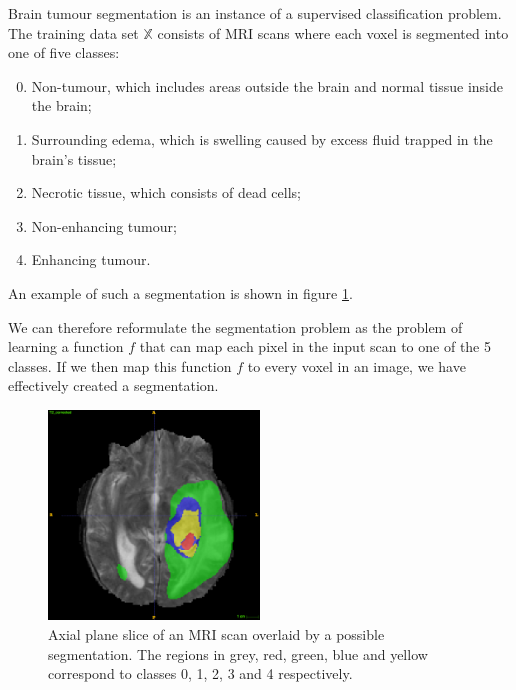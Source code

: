 \documentclass[12pt,a4paper,twoside,openright]{report}
\begin{document}
Brain tumour segmentation is an instance of a supervised classification problem. The training data set $\mathbb{X}$ consists of MRI scans where each voxel is segmented into one of five classes:
\begin{enumerate}
	\setcounter{enumi}{-1}
	\item Non-tumour, which includes areas outside the brain and normal tissue inside the brain;
	\item Surrounding edema, which is swelling caused by excess fluid trapped in the brain's tissue;
	\item Necrotic tissue, which consists of dead cells;
	\item Non-enhancing tumour;
	\item Enhancing tumour.
\end{enumerate} 
An example of such a segmentation is shown in figure \ref{fig:example_segmentation}.

We can therefore reformulate the segmentation problem as the problem of learning a function $f$ that can map each pixel in the input scan to one of the 5 classes. If we then map this function $f$ to every voxel in an image, we have effectively created a segmentation.

\begin{figure}
	\centering
	\includegraphics[width = 0.5\textwidth]{challenge_1_segmentation_with_T2_66}
	\caption[Axial plane slice of an MRI scan overlaid by a possible segmentation.]{Axial plane slice of an MRI scan overlaid by a possible segmentation. The regions in grey, red, green, blue and yellow correspond to classes 0, 1, 2, 3 and 4 respectively. }
	\label{fig:example_segmentation}
\end{figure}
\end{document}
